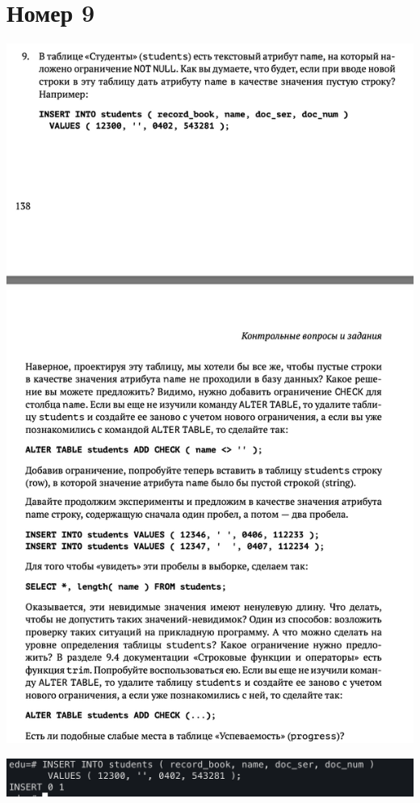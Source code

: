 \documentclass[a4paper,12pt]{article}
\begin{document}
\section*{Номер 9}
\begin{center}
\includegraphics[scale=0.7]{9.png}
\end{center}
\clearpage
\includegraphics[scale=0.5]{91.png}
\\
\end{document}
